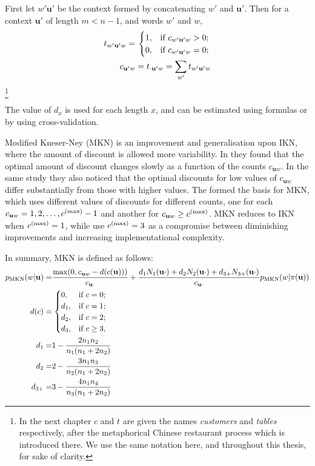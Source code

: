 First let $w'\mathbf{u'}$ be the context formed by concatenating $w'$ and $\mathbf{u'}$. Then for a context $\mathbf{u'}$ of length $m<n-1$, and words $w'$ and $w$,
\begin{equation}
\begin{split}
t_{w'\mathbf{u'}w} = \left.
\begin{cases}
1, & \textnormal{if } c_{w'\mathbf{u'}w} > 0; \\
0, & \textnormal{if } c_{w'\mathbf{u'}w} = 0;
\end{cases}
\right. \\
c_{\mathbf{u'}w} = t_{\cdot\mathbf{u'}w} = \sum_{w'}t_{w'\mathbf{u'}w}
\end{split}
\end{equation}\footnote{In the next chapter $c$ and $t$ are given the names \emph{customers} and \emph{tables} respectively, after the metaphorical Chinese restaurant process which is introduced there. We use the same notation here, and throughout this thesis, for sake of clarity.}

The value of $d_x$ is used for each length $x$, and can be estimated using formulas or by using cross-validation.

Modified Kneser-Ney (MKN) is an improvement and generalisation upon IKN, where the amount of discount is allowed more variability. In \autocite{} they found that the optimal amount of discount changes slowly as a function of the counts $c_{\mathbf{u}w}$. In the same study they also noticed that the optimal discounts for low values of $c_{\mathbf{u}w}$ differ substantially from those with higher values. The formed the basis for MKN, which uses different values of discounts for different counts, one for each $c_{\mathbf{u}w} = 1, 2, \ldots, c^{(\textnormal{max})}-1$ and another for $c_{\mathbf{u}w} \geq c^{(\textnormal{max})}$. MKN reduces to IKN when $c^{(\textnormal{max})} = 1$, while \autocite{} use $c^{(\textnormal{max})} = 3$ as a compromise between diminishing improvements and increasing implementational complexity.

In summary, MKN is defined as follows:
\begin{equation}\begin{split}
p_{\operatorname{MKN}}(w|\mathbf{u}) =& \frac{\max(0, c_{\mathbf{u}w} - d(c(\mathbf{u})))}{c_{\mathbf{u}\cdot}} + \frac{d_1N_1(\mathbf{u}\cdot) + d_2N_2(\mathbf{u}\cdot) + d_{3+}N_{3+}(\mathbf{u}\cdot)}{c_{\mathbf{u}\cdot}}p_{\operatorname{MKN}}(w|\pi(\mathbf{u})) \\
d(c) =& \left.
\begin{cases}
0, & \textnormal{if }c = 0; \\
d_1, & \textnormal{if } c = 1; \\
d_2, & \textnormal{if } c = 2; \\
d_3, & \textnormal{if } c \geq 3,
\end{cases}\right. \\
d_1 =& 1- \frac{2n_1n_2}{n_1(n_1+2n_2)} \\
d_2 =& 2 - \frac{3n_1n_3}{n_2(n_1+2n_2)} \\
d_{3+} =& 3 - \frac{4n_1n_4}{n_3(n_1+2n_2)}
\end{split}\end{equation}

